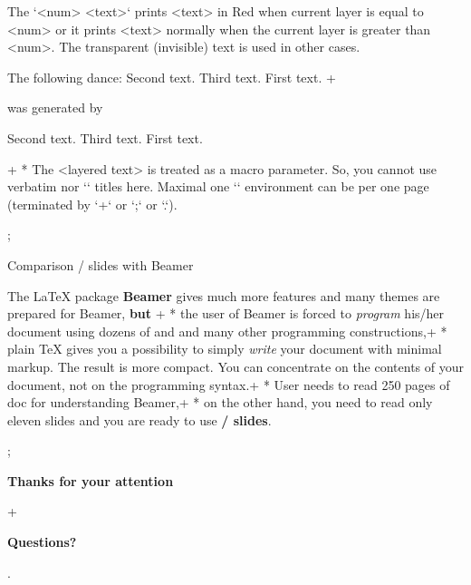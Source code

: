The `{\pshow<num> <text>}` prints <text> in Red when current layer is equal
to <num> or it prints <text> normally when the current layer is greater than <num>.
The transparent (invisible) text is used in other cases.

The following dance:
{ Second text.} { Third text.} { First text.}
\endlayers
\pg+

was generated by

\begtt
{}
{ Second text.} { Third text.} { First text.}
\endlayers
\endtt

\pg+
* The <layered text> is treated as a macro parameter. So, you cannot use verbatim
  nor `\sec` titles here. Maximal one `\layers` environment can be per one
  page (terminated by `\pg+` or `\pg;` or `\pg.`).

\pg; %

\sec Comparison \OpTeX/ slides with Beamer

The \LaTeX{} package {\bf\Blue Beamer} gives much more features and many themes
are prepared for Beamer, {\bf\Red but}
\pg+
* the user of Beamer is forced to {\em program} his/her document using
  dozens of \code{\\begin{foo}} and \code{\\end{foo}} and many other
  programming constructions,\pg+
* plain \TeX{} gives you a possibility to simply
  {\em write} your document with minimal markup. The result is more compact.
  You can concentrate on the contents of your document, not on the
  programming syntax.\pg+
* User needs to read 250 pages of doc for understanding Beamer,\pg+
* on the other hand, you need to read only eleven
  slides
  and you are ready to use {\bf\Blue\OpTeX/ slides}.

\pg; %

\null
\vskip2cm
\centerline{\typosize[35/40]\bf Thanks for your attention}\pg+

\vskip2cm
\centerline{\Blue\typosize[60/70]\bf Questions?}

\pg. %

